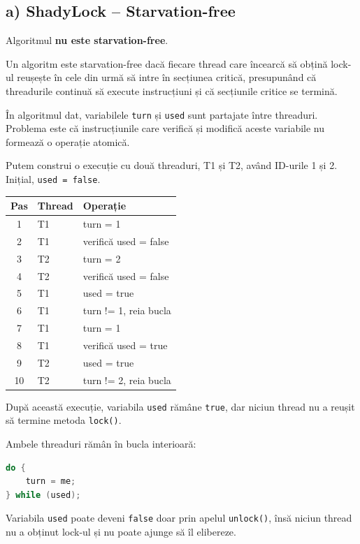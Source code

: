 \documentclass[12pt,a4paper]{article}
\begin{document}
\subsection*{a) ShadyLock -- Starvation-free}

Algoritmul \textbf{nu este starvation-free}.

Un algoritm este starvation-free dacă fiecare
thread care încearcă să obțină lock-ul reușește
în cele din urmă să intre în secțiunea critică,
presupunând că threadurile continuă să execute
instrucțiuni și că secțiunile critice se termină.

În algoritmul dat, variabilele \texttt{turn}
și \texttt{used} sunt partajate între threaduri.
Problema este că instrucțiunile care verifică
și modifică aceste variabile nu formează
o operație atomică.

Putem construi o execuție cu două threaduri,
T1 și T2, având ID-urile 1 și 2.
Inițial, \texttt{used = false}.

\begin{center}
\begin{tabular}{|c|l|l|}
\hline
Pas & Thread & Operație \\ \hline
1 & T1 & turn = 1 \\ \hline
2 & T1 & verifică used = false \\ \hline
3 & T2 & turn = 2 \\ \hline
4 & T2 & verifică used = false \\ \hline
5 & T1 & used = true \\ \hline
6 & T1 & turn != 1, reia bucla \\ \hline
7 & T1 & turn = 1 \\ \hline
8 & T1 & verifică used = true \\ \hline
9 & T2 & used = true \\ \hline
10 & T2 & turn != 2, reia bucla \\ \hline
\end{tabular}
\end{center}

După această execuție, variabila
\texttt{used} rămâne \texttt{true},
dar niciun thread nu a reușit să
termine metoda \texttt{lock()}.

Ambele threaduri rămân în bucla interioară:

\begin{lstlisting}[language=Java]
do {
    turn = me;
} while (used);
\end{lstlisting}

Variabila \texttt{used} poate deveni
\texttt{false} doar prin apelul
\texttt{unlock()}, însă niciun thread
nu a obținut lock-ul și nu poate
ajunge să îl elibereze.
\end{document}

